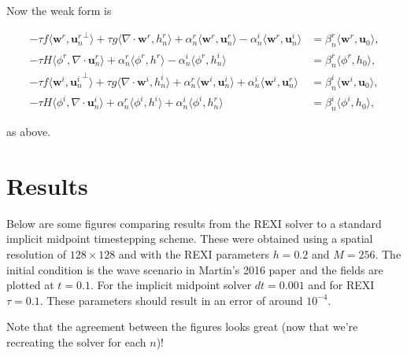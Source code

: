 \documentclass[14pt]{article}
\def\MM#1{\boldsymbol{#1}}
\begin{document}
Now the weak form is

\begin{align}
  -\tau f\langle\MM{w}^r, {\MM{u}_n^r}^\perp\rangle + \tau g\langle\nabla\cdot\MM{w}^r, h_n^r\rangle + \alpha_n^r\langle\MM{w}^r, \MM{u}_n^r\rangle - \alpha_n^i\langle\MM{w}^r, \MM{u}_n^i\rangle &= \beta_n^r\langle\MM{w}^r, \MM{u}_0\rangle, \\
  -\tau H\langle\phi^r, \nabla\cdot\MM{u}_n^r\rangle + \alpha_n^r\langle\phi^r, h^r\rangle - \alpha_n^i\langle\phi^r, h_n^i\rangle & = \beta_n^r \langle\phi^r, h_0\rangle, \\
  -\tau f\langle\MM{w}^i, {\MM{u}_n^i}^\perp\rangle + \tau g\langle\nabla\cdot\MM{w}^i, h_n^i\rangle + \alpha_n^r\langle\MM{w}^i, \MM{u}_n^i\rangle + \alpha_n^i\langle\MM{w}^i, \MM{u}_n^r\rangle &= \beta_n^i\langle\MM{w}^i, \MM{u}_0\rangle, \\
  -\tau H\langle\phi^i, \nabla\cdot\MM{u}_n^i\rangle + \alpha_n^r\langle\phi^i, h^i\rangle + \alpha_n^i\langle\phi^i, h_n^r\rangle & = \beta_n^i \langle\phi^i, h_0\rangle,
\end{align}

\noindent as above.

\section{Results}

Below are some figures comparing results from the REXI solver to a
standard implicit midpoint timestepping scheme. These were obtained
using a spatial resolution of $128\times 128$ and with the REXI
parameters $h=0.2$ and $M=256$. The initial condition is the wave
scenario in Martin's 2016 paper and the fields are plotted at
$t=0.1$. For the implicit midpoint solver $dt=0.001$ and for REXI
$\tau=0.1$. These parameters should result in an error of around
$10^{-4}$.

Note that the agreement between the figures looks great (now that we're recreating the solver for each $n$)!
\end{document}
